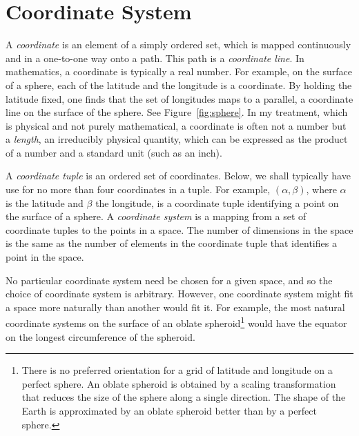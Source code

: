 \section{Coordinate System}

A \emph{coordinate} is an element of a simply ordered set,
which is mapped continuously and in a one-to-one way onto a path.
This path is a \emph{coordinate line}.  In mathematics, a coordinate is
typically a real number.  For example, on the surface of a sphere, each of the
latitude and the longitude is a coordinate.  By holding the latitude fixed, one
finds that the set of longitudes maps to a parallel, a coordinate line on the
surface of the sphere.  See Figure~\ref{fig:sphere}.  In my treatment, which is
physical and not purely mathematical, a coordinate is often not a number but a
\emph{length}, an irreducibly physical quantity, which can be expressed as the
product of a number and a standard unit (such as an inch).

A \emph{coordinate tuple} is an ordered set of coordinates.  Below, we shall
typically have use for no more than four coordinates in a tuple.  For example,
$(\alpha,\beta)$, where $\alpha$ is the latitude and $\beta$ the longitude, is
a coordinate tuple identifying a point on the surface of a sphere.  A
\emph{coordinate system} is a mapping from a set of coordinate tuples to the
points in a space.  The number of dimensions in the space is the same as the
number of elements in the coordinate tuple that identifies a point in the
space.

No particular coordinate system need be chosen for a given space, and so the
choice of coordinate system is arbitrary.  However, one coordinate system might
fit a space more naturally than another would fit it.  For example, the most
natural coordinate systems on the surface of an oblate spheroid\footnote{%
   There is no preferred orientation for a grid of latitude and longitude on a
   perfect sphere.  An oblate spheroid is obtained by a scaling transformation
   that reduces the size of the sphere along a single direction.  The shape of
   the Earth is approximated by an oblate spheroid better than by a perfect
   sphere.%
}
would have the equator on the longest circumference of the spheroid.

